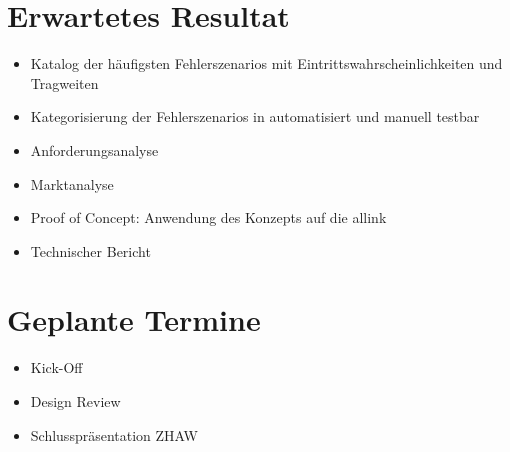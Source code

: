 \section{Erwartetes Resultat}
\label{sec:anhang_erwartetes_resultat}
\begin{itemize}
  \item Katalog der häufigsten Fehlerszenarios mit Eintrittswahrscheinlichkeiten und Tragweiten
  \item Kategorisierung der Fehlerszenarios in automatisiert und manuell testbar
  \item Anforderungsanalyse
  \item Marktanalyse
  \item Proof of Concept: Anwendung des Konzepts auf die allink
  \item Technischer Bericht
\end{itemize}

\section{Geplante Termine}
\label{sec:anhang_geplante_termine}
\begin{itemize}
  \item Kick-Off
  \item Design Review
  \item Schlusspräsentation ZHAW
\end{itemize}
